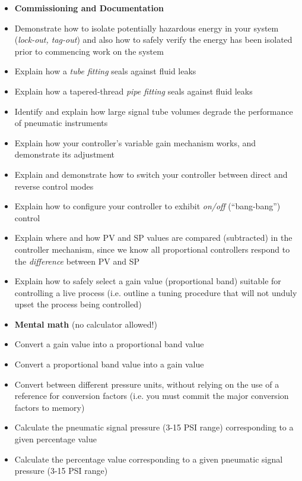 \filbreak

\begin{itemize}
\item{} {\bf Commissioning and Documentation}
\item{} Demonstrate how to isolate potentially hazardous energy in your system ({\it lock-out, tag-out}) and also how to safely verify the energy has been isolated prior to commencing work on the system
\item{} Explain how a {\it tube fitting} seals against fluid leaks
\item{} Explain how a tapered-thread {\it pipe fitting} seals against fluid leaks
\item{} Identify and explain how large signal tube volumes degrade the performance of pneumatic instruments
\item{} Explain how your controller's variable gain mechanism works, and demonstrate its adjustment
\item{} Explain and demonstrate how to switch your controller between direct and reverse control modes
\item{} Explain how to configure your controller to exhibit {\it on/off} (``bang-bang'') control
\item{} Explain where and how PV and SP values are compared (subtracted) in the controller mechanism, since we know all proportional controllers respond to the {\it difference} between PV and SP
\item{} Explain how to safely select a gain value (proportional band) suitable for controlling a live process (i.e. outline a tuning procedure that will not unduly upset the process being controlled)
\end{itemize}

\filbreak

\begin{itemize}
\item{} {\bf Mental math} (no calculator allowed!)
\item{} Convert a gain value into a proportional band value
\item{} Convert a proportional band value into a gain value
\item{} Convert between different pressure units, without relying on the use of a reference for conversion factors (i.e. you must commit the major conversion factors to memory)
\item{} Calculate the pneumatic signal pressure (3-15 PSI range) corresponding to a given percentage value
\item{} Calculate the percentage value corresponding to a given pneumatic signal pressure (3-15 PSI range)
\end{itemize}

